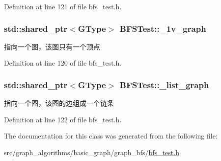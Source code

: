 Definition at line 121 of file bfs\+\_\+test.\+h.

\hypertarget{class_b_f_s_test_a0d7cdb7946902c8d93945a35a222b9d7}{}
\subsubsection[{\+\_\+1v\+\_\+graph}]{\setlength{\rightskip}{0pt plus 5cm}std\+::shared\+\_\+ptr$<${\bf G\+Type}$>$ B\+F\+S\+Test\+::\+\_\+1v\+\_\+graph\hspace{0.3cm}{\ttfamily [protected]}}\label{class_b_f_s_test_a0d7cdb7946902c8d93945a35a222b9d7}
指向一个图，该图只有一个顶点 

Definition at line 120 of file bfs\+\_\+test.\+h.

\hypertarget{class_b_f_s_test_aacf800be44976478c190b2acd338377f}{}
\subsubsection[{\+\_\+list\+\_\+graph}]{\setlength{\rightskip}{0pt plus 5cm}std\+::shared\+\_\+ptr$<${\bf G\+Type}$>$ B\+F\+S\+Test\+::\+\_\+list\+\_\+graph\hspace{0.3cm}{\ttfamily [protected]}}\label{class_b_f_s_test_aacf800be44976478c190b2acd338377f}
指向一个图，该图的边组成一个链条 

Definition at line 122 of file bfs\+\_\+test.\+h.



The documentation for this class was generated from the following file\+:\begin{DoxyCompactItemize}
\item 
src/graph\+\_\+algorithms/basic\+\_\+graph/graph\+\_\+bfs/\hyperlink{bfs__test_8h}{bfs\+\_\+test.\+h}\end{DoxyCompactItemize}

